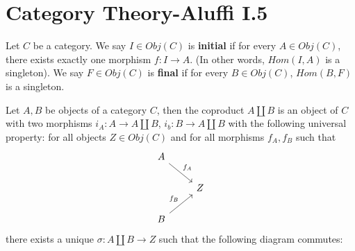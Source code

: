\chapter{Category Theory-Aluffi I.5}

\begin{defn}
    Let $C$ be a category. We say $I\in Obj(C)$ is \textbf{initial} if for every $A\in Obj(C)$, there exists exactly one morphism $f: I\to A$. (In other words, $Hom(I,A)$ is a singleton). We say $F\in Obj(C)$ is \textbf{final} if for every $B\in Obj(C)$, $Hom(B,F)$ is a singleton.
\end{defn}

\begin{defn}[coproduct]
    Let $A,B$ be objects of a category $C$, then the coproduct $A\amalg B$ is an object of $C$ with two morphisms $i_A:A\to A\amalg B$, $i_b: B\to A\amalg B$ with the following universal property:
    for all objects $Z\in Obj(C)$ and for all morphisms $f_A, f_B$ such that 
    \[\begin{tikzcd}
        A \arrow{dr}{f_A} \\
         & Z \\
        B \arrow{ur}{f_B}
        \end{tikzcd}
        \]
    there exists a unique $\sigma:A\amalg B\to Z$ such that the following diagram commutes:
    
\end{defn}
